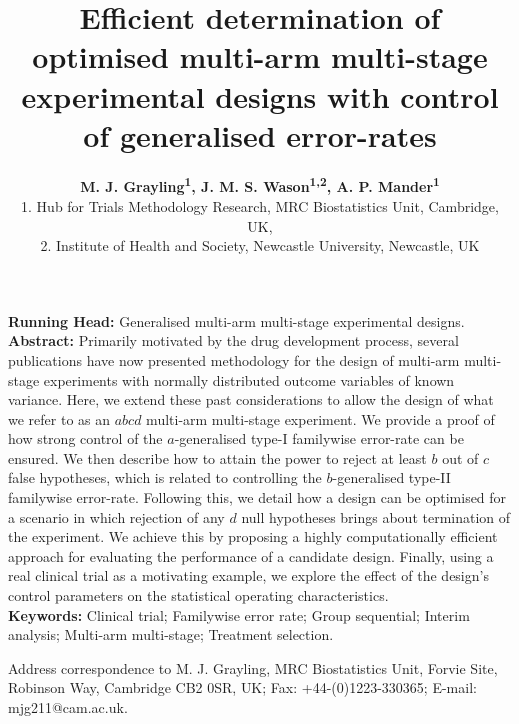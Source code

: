 \documentclass{article}
\numberwithin{equation}{section}
\theoremstyle{plain}
\newenvironment{bottompar}{\par\vspace*{\fill}}{\clearpage}
\begin{document}
\title{\textbf{Efficient determination of optimised multi-arm multi-stage experimental designs with control of generalised error-rates}}
\author{\textbf{M. J. Grayling\textsuperscript{1}, J. M. S. Wason\textsuperscript{1,2}, A. P. Mander\textsuperscript{1}}\\
\small 1. Hub for Trials Methodology Research, MRC Biostatistics Unit, Cambridge, UK,
\\ \small 2. Institute of Health and Society, Newcastle University, Newcastle, UK}
\date{}
\maketitle

\noindent \textbf{Running Head:} Generalised multi-arm multi-stage experimental designs.\\

\noindent \textbf{Abstract:} Primarily motivated by the drug development process, several publications have now presented methodology for the design of multi-arm multi-stage experiments with normally distributed outcome variables of known variance. Here, we extend these past considerations to allow the design of what we refer to as an $abcd$ multi-arm multi-stage experiment. We provide a proof of how strong control of the $a$-generalised type-I familywise error-rate can be ensured. We then describe how to attain the power to reject at least $b$ out of $c$ false hypotheses, which is related to controlling the $b$-generalised type-II familywise error-rate. Following this, we detail how a design can be optimised for a scenario in which rejection of any $d$ null hypotheses brings about termination of the experiment. We achieve this by proposing a highly computationally efficient approach for evaluating the performance of a candidate design. Finally, using a real clinical trial as a motivating example, we explore the effect of the design's control parameters on the statistical operating characteristics.\\

\noindent \textbf{Keywords:} Clinical trial; Familywise error rate; Group sequential; Interim analysis; Multi-arm multi-stage; Treatment selection.\\

\begin{bottompar}
	\noindent Address correspondence to M. J. Grayling, MRC Biostatistics Unit, Forvie Site, Robinson Way, Cambridge CB2 0SR, UK; Fax: +44-(0)1223-330365; E-mail: mjg211@cam.ac.uk. 
\end{bottompar}
\end{document}

